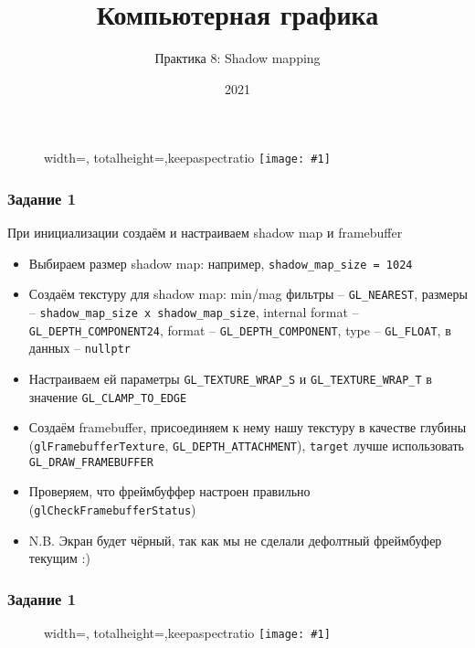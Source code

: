 \documentclass{beamer}
\title{Компьютерная графика}
\subtitle{Практика 8: Shadow mapping}
\date{2021}
\newcommand{\slideimage}[1]{
  \begin{figure}
    \begin{adjustbox}{width=\textwidth, totalheight=\textheight-2\baselineskip-2\baselineskip,keepaspectratio}
      \texttt{[image: \#1]}
    \end{adjustbox}
  \end{figure}
}
\begin{document}
\frame{\titlepage}

\begin{frame}[fragile]
\slideimage{0.png}
\end{frame}

\begin{frame}[fragile]
\frametitle{Задание 1}
\fontsize{10pt}{10pt}
При инициализации создаём и настраиваем shadow map и framebuffer
\begin{itemize}
\item Выбираем размер shadow map: например, \verb|shadow_map_size = 1024|
\item Создаём текстуру для shadow map: min/mag фильтры -- \verb|GL_NEAREST|, размеры -- \verb|shadow_map_size x shadow_map_size|, internal format -- \verb|GL_DEPTH_COMPONENT24|, format -- \verb|GL_DEPTH_COMPONENT|, type -- \verb|GL_FLOAT|, в данных -- \verb|nullptr|
\item Настраиваем ей параметры \verb|GL_TEXTURE_WRAP_S| и \verb|GL_TEXTURE_WRAP_T| в значение \verb|GL_CLAMP_TO_EDGE|
\item Создаём framebuffer, присоединяем к нему нашу текстуру в качестве глубины (\verb|glFramebufferTexture|, \verb|GL_DEPTH_ATTACHMENT|), \verb|target| лучше использовать \verb|GL_DRAW_FRAMEBUFFER|
\item Проверяем, что фреймбуффер настроен правильно (\verb|glCheckFramebufferStatus|)
\item N.B. Экран будет чёрный, так как мы не сделали дефолтный фреймбуфер текущим :)
\end{itemize}
\end{frame}

\begin{frame}[fragile]
\frametitle{Задание 1}
\slideimage{1.png}
\end{frame}
\end{document}
